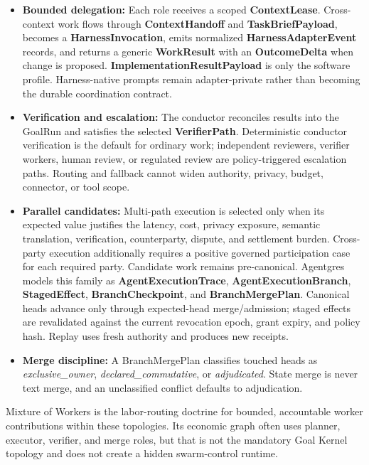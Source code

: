 \documentclass[
  11pt,
]{article}
\providecommand{\tightlist}{%
  \setlength{\itemsep}{0pt}\setlength{\parskip}{0pt}}
\begin{document}
\begin{itemize}
\tightlist
\item
  \textbf{Bounded delegation:} Each role receives a scoped
  \textbf{ContextLease}. Cross-context work flows through
  \textbf{ContextHandoff} and \textbf{TaskBriefPayload}, becomes a
  \textbf{HarnessInvocation}, emits normalized
  \textbf{HarnessAdapterEvent} records, and returns a generic
  \textbf{WorkResult} with an \textbf{OutcomeDelta} when change is proposed.
  \textbf{ImplementationResultPayload} is only the software profile.
  Harness-native prompts remain adapter-private rather than becoming the
  durable coordination contract.
\item
  \textbf{Verification and escalation:} The conductor reconciles results
  into the GoalRun and satisfies the selected \textbf{VerifierPath}.
  Deterministic conductor verification is the default for ordinary work;
  independent reviewers, verifier workers, human review, or regulated review
  are policy-triggered escalation paths. Routing and fallback cannot widen
  authority, privacy, budget, connector, or tool scope.
\item
  \textbf{Parallel candidates:} Multi-path execution is selected only when
  its expected value justifies the latency, cost, privacy exposure, semantic
  translation, verification, counterparty, dispute, and settlement burden.
  Cross-party execution additionally requires a positive governed participation
  case for each required party. Candidate work remains pre-canonical. Agentgres models
  this family as \textbf{AgentExecutionTrace},
  \textbf{AgentExecutionBranch}, \textbf{StagedEffect},
  \textbf{BranchCheckpoint}, and \textbf{BranchMergePlan}. Canonical heads
  advance only through expected-head merge/admission; staged effects are
  revalidated against the current revocation epoch, grant expiry, and policy
  hash. Replay uses fresh authority and produces new receipts.
\item
  \textbf{Merge discipline:} A BranchMergePlan classifies touched heads as
  \emph{exclusive\_owner}, \emph{declared\_commutative}, or
  \emph{adjudicated}. State merge is never text merge, and an unclassified
  conflict defaults to adjudication.
\end{itemize}

Mixture of Workers is the labor-routing doctrine for bounded, accountable
worker contributions within these topologies. Its economic graph often uses
planner, executor, verifier, and merge roles, but that is not the mandatory
Goal Kernel topology and does not create a hidden swarm-control runtime.
\end{document}
